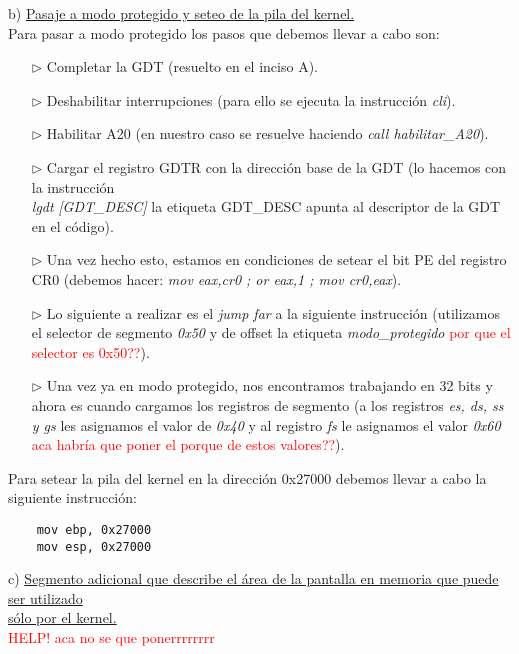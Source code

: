 \documentclass[a4paper]{article}
\begin{document}
{\large b)} \underline{Pasaje a modo protegido y seteo de la pila del kernel.}\\

Para pasar a modo protegido los pasos que debemos llevar a cabo son:


\begin{itemize}
\item[$\triangleright$] Completar la GDT (resuelto en el inciso A).
\item[$\triangleright$] Deshabilitar interrupciones (para ello se ejecuta la instrucci\'on \emph{cli}).
\item[$\triangleright$] Habilitar A20 (en nuestro caso se resuelve haciendo \emph{call habilitar_A20}).
\item[$\triangleright$] Cargar el registro GDTR con la direcci\'on base de la GDT (lo hacemos con la instrucci\'on  \\ \emph{lgdt} \emph{ [GDT_DESC]} la etiqueta GDT_DESC apunta al descriptor de la GDT en el c\'odigo).
\item[$\triangleright$] Una vez hecho esto, estamos en condiciones de setear el bit PE del registro CR0 (debemos hacer: \emph{mov eax,cr0 ; or eax,1 ; mov cr0,eax}).
\item[$\triangleright$] Lo siguiente a realizar es el \emph{jump far} a la siguiente instrucci\'on (utilizamos el selector de segmento \emph{0x50} y de offset la etiqueta \emph{modo_protegido} \textcolor{red}{por que el selector es 0x50??}).
\item[$\triangleright$] Una vez ya en modo protegido, nos encontramos trabajando en 32 bits y ahora es cuando cargamos los registros de segmento (a los registros  \emph{es, ds, ss y gs} les asignamos el valor de \emph{0x40} y al registro \emph{fs} le asignamos el valor \emph{0x60} \textcolor{red}{aca habr\'ia que poner el porque de estos valores??}).
\end{itemize}
 \bigskip	
Para setear la pila del kernel en la direcci\'on 0x27000 debemos llevar a cabo la siguiente instrucci\'on: 
\begin{codesnippet}
\begin{verbatim}
    mov ebp, 0x27000
    mov esp, 0x27000
\end{verbatim}
\end{codesnippet}

{\large c)} \underline{Segmento adicional que describe el \'area de la pantalla en memoria que puede ser utilizado} \\ \underline{s\'olo por el kernel.}
\\
\textcolor{red}{HELP! aca no se que ponerrrrrrrr}
\end{document}
